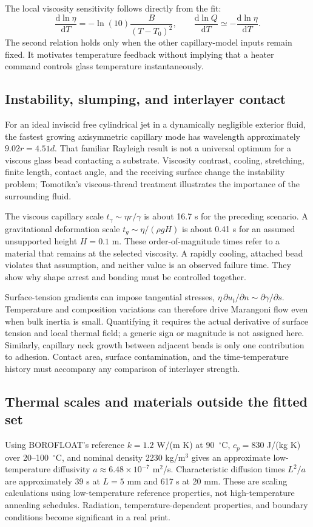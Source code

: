 The local viscosity sensitivity follows directly from the fit:
\begin{equation}
 \frac{\mathrm{d}\ln\eta}{\mathrm{d}T}=-\ln(10)\frac{B}{(T-T_0)^2},\qquad
 \frac{\mathrm{d}\ln Q}{\mathrm{d}T}\simeq-\frac{\mathrm{d}\ln\eta}{\mathrm{d}T}.
\end{equation}
The second relation holds only when the other capillary-model inputs remain fixed. It motivates temperature feedback without implying that a heater command controls glass temperature instantaneously.

\subsection{Instability, slumping, and interlayer contact}
For an ideal inviscid free cylindrical jet in a dynamically negligible exterior fluid, the fastest growing axisymmetric capillary mode has wavelength approximately $9.02r=4.51d$. That familiar Rayleigh result is not a universal optimum for a viscous glass bead contacting a substrate. Viscosity contrast, cooling, stretching, finite length, contact angle, and the receiving surface change the instability problem; Tomotika's viscous-thread treatment illustrates the importance of the surrounding fluid.\cite{phys_rayleigh,phys_tomotika}

The viscous capillary scale $t_\gamma\sim\eta r/\gamma$ is about 16.7 s for the preceding scenario. A gravitational deformation scale $t_g\sim\eta/(\rho gH)$ is about 0.41 s for an assumed unsupported height $H=0.1$ m. These order-of-magnitude times refer to a material that remains at the selected viscosity. A rapidly cooling, attached bead violates that assumption, and neither value is an observed failure time. They show why shape arrest and bonding must be controlled together.

Surface-tension gradients can impose tangential stresses, $\eta\,\partial u_t/\partial n\sim\partial\gamma/\partial s$. Temperature and composition variations can therefore drive Marangoni flow even when bulk inertia is small. Quantifying it requires the actual derivative of surface tension and local thermal field; a generic sign or magnitude is not assigned here. Similarly, capillary neck growth between adjacent beads is only one contribution to adhesion. Contact area, surface contamination, and the time-temperature history must accompany any comparison of interlayer strength.

\subsection{Thermal scales and materials outside the fitted set}
Using BOROFLOAT's reference $k=1.2$ W/(m K) at 90~$^{\circ}$C, $c_p=830$ J/(kg K) over 20--100~$^{\circ}$C, and nominal density 2230 kg/m$^3$ gives an approximate low-temperature diffusivity $a\approx6.48\times10^{-7}$ m$^2$/s. Characteristic diffusion times $L^2/a$ are approximately 39 s at $L=5$ mm and 617 s at 20 mm. These are scaling calculations using low-temperature reference properties, not high-temperature annealing schedules. Radiation, temperature-dependent properties, and boundary conditions become significant in a real print.\cite{phys_boro}

